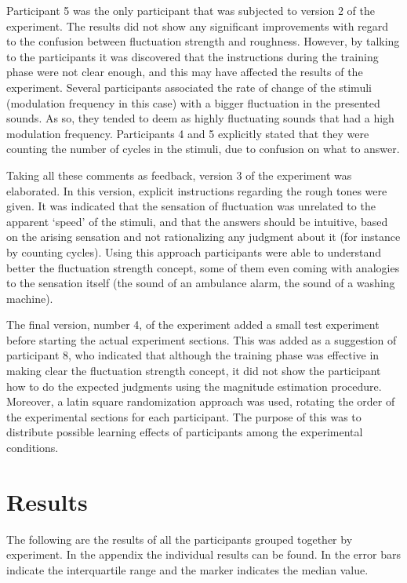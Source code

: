 \documentclass[../main.tex]{subfiles}
\begin{document}
Participant 5 was the only participant that was subjected to version 2 of the
experiment. The results did not show any significant improvements with regard
to the confusion between fluctuation strength and roughness. However, by talking
to the participants it was discovered that the instructions during the training
phase were not clear enough, and this may have affected the results of the
experiment. Several participants associated the rate of change of the stimuli
(modulation frequency in this case) with a bigger fluctuation in the presented
sounds. As so, they tended to deem as highly fluctuating sounds that had a high
modulation frequency. Participants 4 and 5 explicitly stated that they were
counting the number of cycles in the stimuli, due to confusion on what to
answer.

Taking all these comments as feedback, version 3 of the experiment was
elaborated. In this version, explicit instructions regarding the rough tones
were given. It was indicated that the sensation of fluctuation was unrelated to
the apparent `speed' of the stimuli, and that the answers should be intuitive,
based on the arising sensation and not rationalizing any judgment about it
(for instance by counting cycles). Using this approach participants were able to
understand better the fluctuation strength concept, some of them even coming
with analogies to the sensation itself (the sound of an ambulance alarm, the
sound of a washing machine).

The final version, number 4, of the experiment added a small test experiment
before starting the actual experiment sections. This was added as a suggestion
of participant 8, who indicated that although the training phase was effective
in making clear the fluctuation strength concept, it did not show the
participant how to do the expected judgments using the magnitude estimation
procedure. Moreover, a latin square randomization approach was used, rotating
the order of the experimental sections for each participant. The purpose of this
was to distribute possible learning effects of participants among the
experimental conditions.

\section{Results}

The following are the results of all the participants grouped together by
experiment. In the appendix the individual results can be found. In
 the error bars
indicate the interquartile range and the marker indicates the median value.
\end{document}
